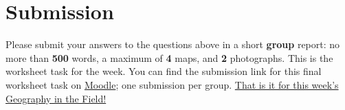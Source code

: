 \documentclass[
]{book}
\begin{document}
\hypertarget{submission}{%
\section*{Submission}\label{submission}}

Please submit your answers to the questions above in a short \textbf{group} report: no more than \textbf{500} words, a maximum of \textbf{4} maps, and \textbf{2} photographs. This is the worksheet task for the week. You can find the submission link for this final worksheet task on \href{https://moodle.ucl.ac.uk/course/view.php?id=23839}{Moodle}; one submission per group. \href{https://www.youtube.com/watch?v=h_D3VFfhvs4}{That is it for this week's Geography in the Field!}
\end{document}

